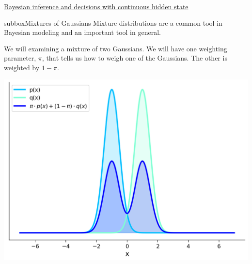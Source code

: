\begin{textbox}{\href{https://compneuro.neuromatch.io/tutorials/W3D1_BayesianDecisions/student/W3D1_Tutorial2.html}{Bayesian inference and decisions with continuous hidden state } }
\begin{subbox}{subbox}{Mixtures of Gaussians}
Mixture distributions are a common tool in Bayesian modeling and an important tool in general.

We will examining a mixture of two Gaussians. We will have one weighting parameter, $\pi$, that tells us how to weigh one of the Gaussians. The other is weighted by $1 -\pi$. 

\begin{center}
    
\includegraphics[scale=0.22]{Figures/BD/BD_Figure7.png}
\end{center}
\end{subbox}


\end{textbox}
